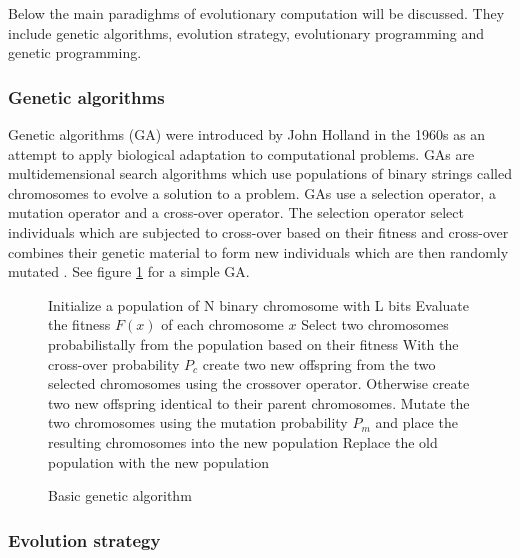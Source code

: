 Below the main paradighms of evolutionary computation will be discussed. They include genetic algorithms, evolution strategy, evolutionary programming and genetic programming.

\subsubsection{Genetic algorithms}

Genetic algorithms (GA) were introduced by John Holland in the 1960s as an attempt to apply biological adaptation to computational problems. GAs are multidemensional search algorithms which use populations of binary strings called chromosomes to evolve a solution to a problem. GAs use a selection operator, a mutation operator and a cross-over operator. The selection operator select individuals which are subjected to cross-over based on their fitness and cross-over combines their genetic material to form new individuals which are then randomly mutated \cite{mitchel1999evolutionary}. See figure \ref{algo:geneticalgorithm} for a simple GA.

\begin{figure}[h]
  \centering
  \begin{minipage}{12.5cm}
    \begin{algorithmic}
       \State Initialize a population of N binary chromosome with L bits
        \State Evaluate the fitness $F(x)$ of each chromosome $x$
        \Repeat
          \State Select two chromosomes probabilistally from the population
          \State based on their fitness
          \State With the cross-over probability $P_c$ create two new offspring
          \State from the two selected chromosomes using the crossover operator.
          \State Otherwise create two new offspring identical to their parent chromosomes.
          \State Mutate the two chromosomes using the mutation probability $P_m$
          \State and place the resulting chromosomes into the new population
        \State Replace the old population with the new population
       \EndWhile
    \end{algorithmic}
  \end{minipage}
  \caption{Basic genetic algorithm}
  \label{algo:geneticalgorithm}
\end{figure}

\subsubsection{Evolution strategy}

